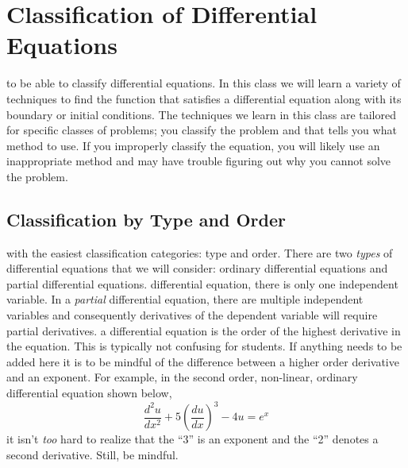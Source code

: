 \section{Classification of Differential Equations}
 to be able to classify differential equations.  In this class we will learn a variety of techniques to find the function that satisfies a differential equation along with its boundary or initial conditions. The techniques we learn in this class are tailored for specific classes of problems; you classify the problem and that tells you what method to use.  If you improperly classify the equation, you will likely use an inappropriate method and may have trouble figuring out why you cannot solve the problem.  
\subsection{Classification by Type and Order}
 with the easiest classification categories: type and order.  There are two \emph{types} of differential equations that we will consider: ordinary differential equations and partial differential equations.  
 differential equation, there is only one independent variable.  In a \emph{partial} differential equation, there are multiple independent variables and consequently derivatives of the dependent variable will require partial derivatives.
 a differential equation is the order of the highest derivative in the equation.  This is typically not confusing for students. If anything needs to be added here it is to be mindful of the difference between a higher order derivative and an exponent.  For example, in the second order, non-linear, ordinary differential equation shown below, 
$$ \frac{d^2u}{dx^2}+5\left(\frac{du}{dx} \right)^3 - 4u = e^{x}  $$
it isn't \emph{too} hard to realize that the ``3'' is an exponent and the ``2'' denotes a second derivative. Still, be mindful.   

